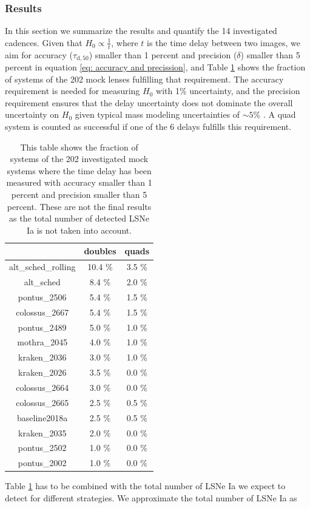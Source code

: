 \subsubsection{Results}
\label{sec:results}
In this section we summarize the results and quantify the 14
investigated cadences. Given that $H_0 \propto \frac{1}{t}$, where $t$
is the time delay between two images, we aim for accuracy
($\tau_\mathrm{d,50}$) smaller than 1 percent and precision ($\delta$)
smaller than 5 percent in equation \ref{eq: accuracy and precission},
and Table \ref{tab: fraction of systems} shows the fraction of systems
of the 202 mock lenses fulfilling that requirement. The accuracy
requirement is needed for measuring $H_0$ with 1\% uncertainty, and
the precision requirement ensures that the delay uncertainty does not
dominate the overall uncertainty on $H_0$ given typical mass modeling
uncertainties of $\sim 5\%$ \citep[e.g.,][]{Suyu2018}.  A quad system is counted as successful if one of the 6 delays fulfills this requirement.\\
%
\begin{table}
\centering
\begin{tabular}{c|c|c}
& doubles & quads \\
\hline
alt\_sched\_rolling & 10.4 \% &3.5 \% \\
\hline
alt\_sched & 8.4 \% & 2.0 \% \\
\hline
pontus\_2506 & 5.4 \% &1.5 \% \\
\hline
colossus\_2667 & 5.4 \% &1.5 \% \\
\hline
pontus\_2489 & 5.0 \% &1.0 \% \\
\hline
mothra\_2045 & 4.0 \% &1.0 \% \\
\hline
kraken\_2036 & 3.0 \% &1.0 \% \\
\hline
kraken\_2026 & 3.5 \% &0.0 \% \\
\hline
colossus\_2664 & 3.0 \% &0.0 \% \\
\hline
colossus\_2665 & 2.5 \% &0.5 \% \\
\hline
baseline2018a & 2.5 \% &0.5 \% \\
\hline
kraken\_2035 & 2.0 \% &0.0 \% \\
\hline
pontus\_2502 & 1.0 \% &0.0 \% \\
\hline
pontus\_2002 & 1.0 \% &0.0 \% \\
\end{tabular}
\caption{This table shows the fraction of systems of the 202 investigated mock systems where the time delay has been measured with accuracy smaller than 1 percent and precision smaller than 5 percent. These are not the final results as the total number of detected LSNe Ia is not taken into account. }
\label{tab: fraction of systems}
\end{table}
Table \ref{tab: fraction of systems} has to be combined with the total number of LSNe Ia we expect to detect for different strategies. We approximate the total number of LSNe Ia as

